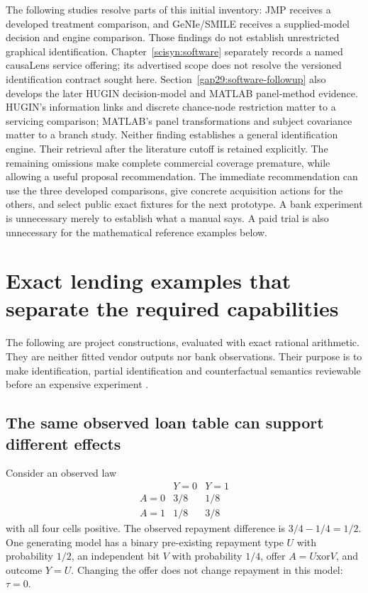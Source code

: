 The following studies resolve parts of this initial inventory: JMP receives
a developed treatment comparison, and GeNIe/SMILE receives a supplied-model
decision and engine comparison. Those findings do not establish unrestricted
graphical identification. Chapter~\ref{scisyn:software} separately records a
named causaLens service offering; its advertised scope does not resolve the
versioned identification contract sought here. Section~\ref{gap29:software-followup}
also develops the later HUGIN decision-model and MATLAB panel-method evidence.
HUGIN's information links and discrete chance-node restriction matter to a
servicing comparison; MATLAB's panel transformations and subject covariance
matter to a branch study. Neither finding establishes a general identification
engine. Their retrieval after the literature cutoff is retained explicitly.
\citep{gap29hugin,gap29matlab}
The remaining omissions make
complete commercial coverage premature, while allowing a useful proposal
recommendation. The immediate recommendation can
use the three developed comparisons, give concrete acquisition actions for
the others, and select public exact fixtures for the next prototype. A bank
experiment is unnecessary merely to establish what a manual says. A paid trial
is also unnecessary for the mathematical reference examples below.

\section{Exact lending examples that separate the required capabilities}

The following are project constructions, evaluated with exact rational
arithmetic. They are neither fitted vendor outputs nor bank observations.
Their purpose is to make identification, partial identification and
counterfactual semantics reviewable before an expensive experiment
\citep{exec13_ci_examples}.

\subsection{The same observed loan table can support different effects}

Consider an observed law
\[
\begin{array}{c|cc}
 &Y=0&Y=1\\\hline
A=0&3/8&1/8\\
A=1&1/8&3/8
\end{array}
\]
with all four cells positive. The observed repayment difference is
$3/4-1/4=1/2$. One generating model has a binary pre-existing repayment type
$U$ with probability $1/2$, an independent bit $V$ with probability $1/4$,
offer $A=U\mathbin{\mathrm{xor}}V$, and outcome $Y=U$. Changing the offer
does not change repayment in this model: $\tau=0$.

